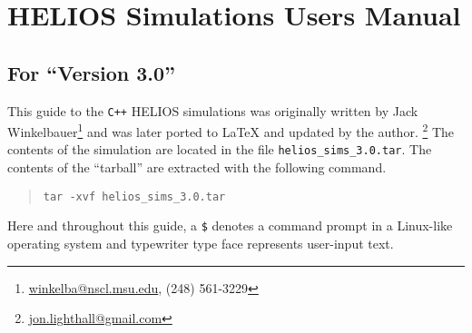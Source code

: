 \makeatletter%
\def\@xobeysp{ }%
\makeatother%
\renewcommand{\arraystretch}{1} %
\sloppy%
\chapter[Simulations Manual]{HELIOS Simulations Users Manual}
\label{sim_man}
\newcommand{\subtitle}[1]{\vspace*{-2.0\baselineskip}%
	\noindent\large\textbf{#1}%
	\normalsize\vspace{1.0\baselineskip}} 
	
	\newcommand{\subtitleb}[1]{\vspace*{-2.5\baselineskip}%
	\section*{#1}
	\normalsize\vspace{0.5\baselineskip}}
\subtitleb{For ``Version 3.0''}


This guide to the \texttt{C++} HELIOS simulations was originally written by Jack Winkelbauer\footnote{ \href{mailto:winkelba@nscl.msu.edu}{winkelba@nscl.msu.edu}, (248) 561-3229} and was later ported to \LaTeX{} and updated by the author.%
\footnote{%
\href{mailto:jon.lighthall@gmail.com}{jon.lighthall@gmail.com}} The contents of the simulation are located in the file \texttt{helios\_sims\_3.0.tar}.  The contents of the ``tarball'' are extracted with the following command.
\renewcommand{\FancyVerbFormatLine}[1]{{{\color{green} \$ }}#1}%
\begin{quote}
\begin{Verbatim}
tar -xvf helios_sims_3.0.tar
\end{Verbatim}
\end{quote}
Here and throughout this guide, a {\color{green}\texttt{\$}} denotes a command prompt in a Linux-like operating system and typewriter type face represents user-input text.
